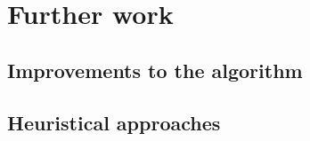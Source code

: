\documentclass[thesis.tex]{subfiles}
\begin{document}
\chapter{Further work}
\section{Improvements to the algorithm}
\section{Heuristical approaches}
\end{document}
